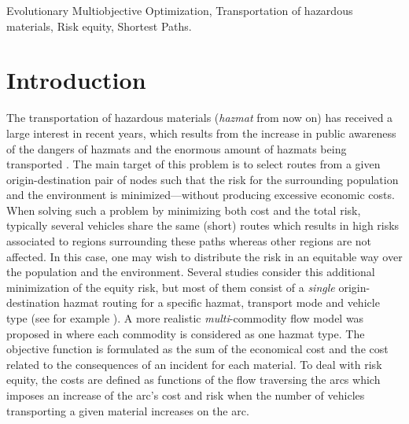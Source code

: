 \documentclass[preprint,12pt]{elsarticle}
\begin{document}
\begin{frontmatter}
\begin{keyword}
Evolutionary Multiobjective Optimization, Transportation of hazardous materials, Risk equity, Shortest Paths. 
\end{keyword}

\end{frontmatter}


\section{Introduction}
The transportation of hazardous materials ({\em hazmat} from now on) has received a large interest in recent years, which results from the increase in public awareness of the dangers of hazmats and the enormous amount of hazmats being transported \cite{cd2008a}. The main target of this problem is to select routes from a given origin-destination pair of nodes such that the risk for the surrounding population and the environment is minimized---without producing excessive economic costs. 
%
When solving such a problem by minimizing both cost and the total risk, typically several vehicles share the same (short) routes which results in high risks associated to regions surrounding these paths whereas other regions are not affected. In this case, one may wish to distribute the risk in an equitable way over the population and the environment. Several studies consider this additional minimization of the equity risk, but most of them consist of a \emph{single} origin-destination hazmat routing for a specific hazmat, transport mode and vehicle type (see for example \cite{aeb2000a, cd2008a}).
% 
% 
%
A more realistic \emph{multi}-commodity flow model was proposed in \citep{cd2008a} where each commodity is considered as one hazmat type. The objective function is formulated as the sum of the economical cost and the cost related to the consequences of an incident for each material. To deal with risk equity, the costs are defined as functions of the flow traversing the arcs which imposes an increase of the arc's cost and risk when the number of vehicles transporting a given material increases on the arc.
\end{document}

